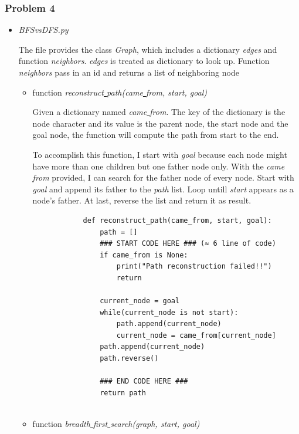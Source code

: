\documentclass[aps,letterpaper,10pt]{revtex4}
\begin{document}
\subsubsection{Problem 4}

\begin{itemize}
	\item \emph{BFSvsDFS.py}

	The file provides the class \emph{Graph}, which includes a dictionary \emph{edges} and function \emph{neighbors}.  
	\emph{edges} is treated as dictionary to look up. 
	Function \emph{neighbors} pass in an id and returns a list of neighboring node

	\begin{itemize}
		\item function \emph{reconstruct\underline{ }path(came\underline{ }from, start, goal)}
		
		Given a dictionary named \emph{came\underline{ }from}. The key of the dictionary is the node 
    	character and its value is the parent node, the start node
		and the goal node, the function will compute the path from start to the end.


		\vspace{3mm}
		To accomplish this function, I start with \emph{goal} because each node might have more than one children 
		but one father node only. With the \emph{came\underline{ }from} provided, I can search for the father node of every node.
		Start with \emph{goal} and append its father to the \emph{path} list. Loop untill \emph{start} appears as a node's father.
		At last, reverse the list and return it as result.

		\begin{lstlisting}
			def reconstruct_path(came_from, start, goal):
				path = []
				### START CODE HERE ### (≈ 6 line of code)
				if came_from is None:
					print("Path reconstruction failed!!")
					return 

				current_node = goal
				while(current_node is not start):
					path.append(current_node)
					current_node = came_from[current_node]
				path.append(current_node)
				path.reverse()

				### END CODE HERE ###
				return path
			
		\end{lstlisting}
		\vspace{3mm}
		\item function \emph{breadth\underline{ }first\underline{ }search(graph, start, goal)}
		

\end{itemize}
\end{itemize}
\end{document}
